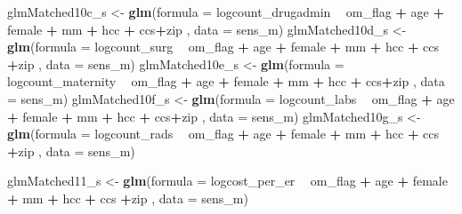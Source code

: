 \documentclass[]{article}
\newenvironment{Shaded}{\begin{snugshade}}{\end{snugshade}}
\newcommand{\KeywordTok}[1]{\textcolor[rgb]{0.13,0.29,0.53}{\textbf{#1}}}
\newcommand{\DataTypeTok}[1]{\textcolor[rgb]{0.13,0.29,0.53}{#1}}
\newcommand{\StringTok}[1]{\textcolor[rgb]{0.31,0.60,0.02}{#1}}
\newcommand{\OperatorTok}[1]{\textcolor[rgb]{0.81,0.36,0.00}{\textbf{#1}}}
\newcommand{\NormalTok}[1]{#1}
\begin{document}
\begin{Shaded}
\begin{Highlighting}[]
\NormalTok{glmMatched10c_s <-}\StringTok{ }\KeywordTok{glm}\NormalTok{(}\DataTypeTok{formula =}\NormalTok{ logcount_drugadmin }\OperatorTok{~}\StringTok{ }\NormalTok{om_flag }\OperatorTok{+}\StringTok{ }\NormalTok{age }\OperatorTok{+}\StringTok{ }\NormalTok{female }\OperatorTok{+}\StringTok{ }\NormalTok{mm }\OperatorTok{+}\StringTok{ }\NormalTok{hcc }\OperatorTok{+}\StringTok{ }\NormalTok{ccs}\OperatorTok{+}\NormalTok{zip  ,}
                     \DataTypeTok{data    =}\NormalTok{ sens_m)}
\NormalTok{glmMatched10d_s <-}\StringTok{ }\KeywordTok{glm}\NormalTok{(}\DataTypeTok{formula =}\NormalTok{ logcount_surg }\OperatorTok{~}\StringTok{ }\NormalTok{om_flag }\OperatorTok{+}\StringTok{ }\NormalTok{age }\OperatorTok{+}\StringTok{ }\NormalTok{female }\OperatorTok{+}\StringTok{ }\NormalTok{mm }\OperatorTok{+}\StringTok{ }\NormalTok{hcc }\OperatorTok{+}\StringTok{ }\NormalTok{ccs }\OperatorTok{+}\NormalTok{zip ,}
                     \DataTypeTok{data    =}\NormalTok{ sens_m)}
\NormalTok{glmMatched10e_s <-}\StringTok{ }\KeywordTok{glm}\NormalTok{(}\DataTypeTok{formula =}\NormalTok{ logcount_maternity }\OperatorTok{~}\StringTok{ }\NormalTok{om_flag }\OperatorTok{+}\StringTok{ }\NormalTok{age }\OperatorTok{+}\StringTok{ }\NormalTok{female }\OperatorTok{+}\StringTok{ }\NormalTok{mm }\OperatorTok{+}\StringTok{ }\NormalTok{hcc }\OperatorTok{+}\StringTok{ }\NormalTok{ccs}\OperatorTok{+}\NormalTok{zip  ,}
                     \DataTypeTok{data    =}\NormalTok{ sens_m)}
\NormalTok{glmMatched10f_s <-}\StringTok{ }\KeywordTok{glm}\NormalTok{(}\DataTypeTok{formula =}\NormalTok{ logcount_labs }\OperatorTok{~}\StringTok{ }\NormalTok{om_flag }\OperatorTok{+}\StringTok{ }\NormalTok{age }\OperatorTok{+}\StringTok{ }\NormalTok{female }\OperatorTok{+}\StringTok{ }\NormalTok{mm }\OperatorTok{+}\StringTok{ }\NormalTok{hcc }\OperatorTok{+}\StringTok{ }\NormalTok{ccs}\OperatorTok{+}\NormalTok{zip  ,}
                     \DataTypeTok{data    =}\NormalTok{ sens_m)}
\NormalTok{glmMatched10g_s <-}\StringTok{ }\KeywordTok{glm}\NormalTok{(}\DataTypeTok{formula =}\NormalTok{ logcount_rads }\OperatorTok{~}\StringTok{ }\NormalTok{om_flag }\OperatorTok{+}\StringTok{ }\NormalTok{age }\OperatorTok{+}\StringTok{ }\NormalTok{female }\OperatorTok{+}\StringTok{ }\NormalTok{mm }\OperatorTok{+}\StringTok{ }\NormalTok{hcc }\OperatorTok{+}\StringTok{ }\NormalTok{ccs }\OperatorTok{+}\NormalTok{zip ,}
                     \DataTypeTok{data    =}\NormalTok{ sens_m)}


\NormalTok{glmMatched11_s <-}\StringTok{ }\KeywordTok{glm}\NormalTok{(}\DataTypeTok{formula =}\NormalTok{ logcost_per_er }\OperatorTok{~}\StringTok{ }\NormalTok{om_flag }\OperatorTok{+}\StringTok{ }\NormalTok{age }\OperatorTok{+}\StringTok{ }\NormalTok{female }\OperatorTok{+}\StringTok{ }\NormalTok{mm }\OperatorTok{+}\StringTok{ }\NormalTok{hcc }\OperatorTok{+}\StringTok{ }\NormalTok{ccs }\OperatorTok{+}\NormalTok{zip ,}
                    \DataTypeTok{data    =}\NormalTok{ sens_m)}


\end{Highlighting}
\end{Shaded}
\end{document}
